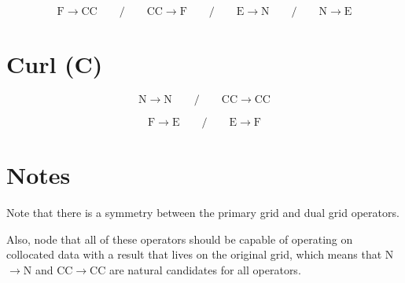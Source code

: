 \documentclass[11pt]{article}
\begin{document}
\begin{equation}
	\text{F} \rightarrow \text{CC}
	\qquad / \qquad 
	\text{CC} \rightarrow \text{F}
	\qquad / \qquad 
	\text{E} \rightarrow \text{N}
	\qquad / \qquad 
	\text{N} \rightarrow \text{E}
\end{equation}

\section{Curl (C)}

\begin{equation}
	\text{N} \rightarrow \text{N} 
	\qquad / \qquad 
	\text{CC} \rightarrow \text{CC}
\end{equation}

\begin{equation}
	\text{F} \rightarrow \text{E}
	\qquad / \qquad 
	\text{E} \rightarrow \text{F}
\end{equation}



\section{Notes}

Note that there is a symmetry between the primary grid and dual grid operators.

Also, node that all of these operators should be capable of operating on collocated data with a result that lives on the original grid, which means that N$\rightarrow$N and CC$\rightarrow$CC are natural candidates for all operators.
\end{document}
